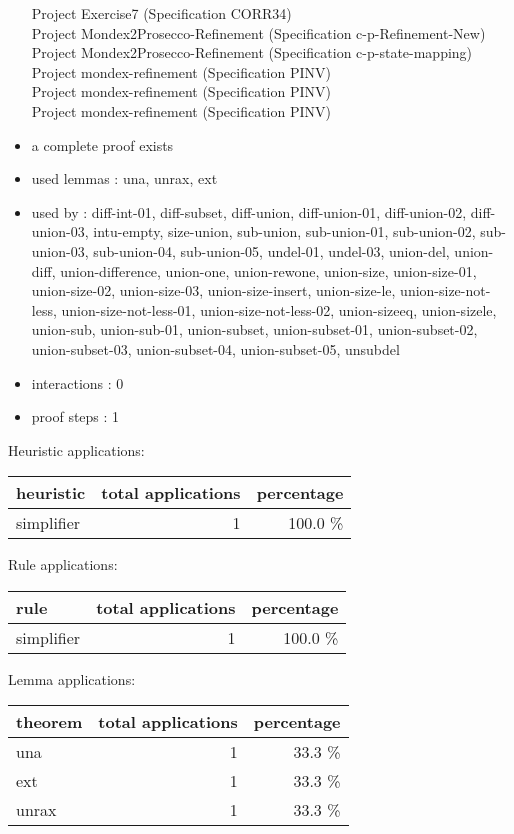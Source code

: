 \documentclass[a4paper]{article}
\begin{document}
\begin{itemize}
Project Exercise7 (Specification CORR34) \\
Project Mondex2Prosecco-Refinement (Specification c-p-Refinement-New) \\
Project Mondex2Prosecco-Refinement (Specification c-p-state-mapping) \\
Project mondex-refinement (Specification PINV) \\
Project mondex-refinement (Specification PINV) \\
Project mondex-refinement (Specification PINV)
\item       a complete proof exists
\item       used lemmas  : una, unrax, ext
\item       used by      : diff-int-01, diff-subset, diff-union, diff-union-01, diff-union-02, diff-union-03, intu-empty, size-union, sub-union, sub-union-01, sub-union-02, sub-union-03, sub-union-04, sub-union-05, undel-01, undel-03, union-del, union-diff, union-difference, union-one, union-rewone, union-size, union-size-01, union-size-02, union-size-03, union-size-insert, union-size-le, union-size-not-less, union-size-not-less-01, union-size-not-less-02, union-sizeeq, union-sizele, union-sub, union-sub-01, union-subset, union-subset-01, union-subset-02, union-subset-03, union-subset-04, union-subset-05, unsubdel
\item       interactions : 0
\item       proof steps  : 1
\end{itemize}

\medskip


Heuristic applications:

\begin{supertabular}{l|r|r}
heuristic	& total applications & percentage \\ \hline
simplifier & 1 & 100.0 \% \\

\end{supertabular}

Rule applications:

\begin{supertabular}{l|r|r}
rule	        & total applications & percentage \\ \hline
simplifier & 1 & 100.0 \% \\

\end{supertabular}

Lemma applications:

\begin{supertabular}{l|r|r}
theorem	        & total applications & percentage \\ \hline
una & 1 & 33.3 \% \\
ext & 1 & 33.3 \% \\
unrax & 1 & 33.3 \% \\

\end{supertabular}
\pagebreak
\end{document}
